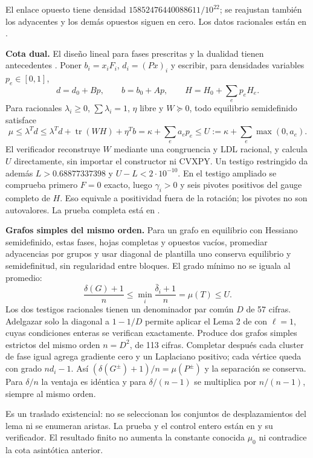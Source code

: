 \documentclass[10pt,a4paper]{article}
\newcommand{\muo}{\mu_0}
\begin{document}
El enlace opuesto tiene densidad $15852476440088611/10^{22}$; se reajustan también los adyacentes y los demás opuestos siguen en cero. Los datos racionales están en .

\textbf{Cota dual.} El diseño lineal para fases prescritas y la dualidad tienen antecedentes \cite{menara,boyd}. Poner $b_i=x_iF_i$, $d_i=(Px)_i$ y escribir, para densidades variables $p_e\in[0,1]$,
\[
 d=d_0+Bp,\qquad b=b_0+Ap,\qquad H=H_0+\sum_e p_eH_e.
\]
Para racionales $\lambda_i\geq0$, $\sum\lambda_i=1$, $\eta$ libre y $W\succeq0$, todo equilibrio semidefinido satisface
\[
 \mu\leq\lambda^Td\leq\lambda^Td+\operatorname{tr}(WH)+\eta^Tb
 =\kappa+\sum_e a_ep_e\leq U:=\kappa+\sum_e\max(0,a_e).
\]
El verificador reconstruye $W$ mediante una congruencia y LDL racional, y calcula $U$ directamente, sin importar el constructor ni CVXPY. Un testigo restringido da además $L>0.68877337398$ y $U-L<2\cdot10^{-10}$. En el testigo ampliado se comprueba primero $F=0$ exacto, luego $\gamma_i>0$ y seis pivotes positivos del gauge completo de $H$. Eso equivale a positividad fuera de la rotación; los pivotes no son autovalores. La prueba completa está en .

\textbf{Grafos simples del mismo orden.} Para un grafo en equilibrio con Hessiano semidefinido, estas fases, hojas completas y opuestos vacíos, promediar adyacencias por grupos y usar diagonal de plantilla uno conserva equilibrio y semidefinitud, sin regularidad entre bloques. El grado mínimo no se iguala al promedio:
\[
 \frac{\delta(G)+1}{n}\leq\min_i\frac{\bar\delta_i+1}{n}=\mu(T)\leq U.
\]
Los dos testigos racionales tienen un denominador par común $D$ de 57 cifras. Adelgazar solo la diagonal a $1-1/D$ permite aplicar el Lema 2 de \cite{okeeffe} con $\ell=1$, cuyas condiciones enteras se verifican exactamente. Produce dos grafos simples estrictos del mismo orden $n=D^2$, de 113 cifras. Completar después cada cluster de fase igual agrega gradiente cero y un Laplaciano positivo; cada vértice queda con grado $nd_i-1$. Así $(\delta(G^\pm)+1)/n=\mu(P^\pm)$ y la separación se conserva. Para $\delta/n$ la ventaja es idéntica y para $\delta/(n-1)$ se multiplica por $n/(n-1)$, siempre al mismo orden.

Es un traslado existencial: no se seleccionan los conjuntos de desplazamientos del lema ni se enumeran aristas. La prueba y el control entero están en  y su verificador. El resultado finito no aumenta la constante conocida $\muo$ ni contradice la cota asintótica anterior.
\end{document}
